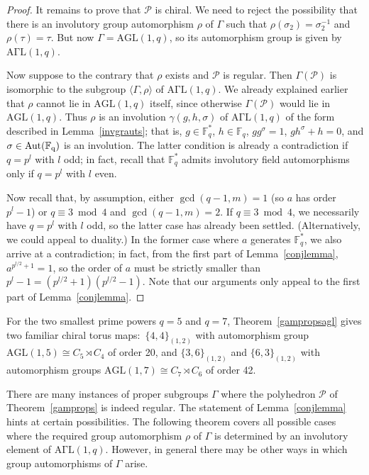 \documentclass[12pt]{article}
\theoremstyle{definition}\newtheorem{definition}{Definition}[section]
\begin{document}
\begin{proof}
It remains to prove that $\mathcal{P}$ is chiral. We need to reject the possibility that there is an involutory group automorphism $\rho$ of $\Gamma$ such that $\rho(\sigma_2)=\sigma_2^{-1}$ and $\rho(\tau)=\tau$. 
But now $\Gamma=\mathrm{AGL}(1,q)$, so its automorphism group is given by $\mathrm{A\Gamma L}(1,q)$. 

Now suppose to the contrary that $\rho$ exists and $\mathcal{P}$ is regular. Then $\Gamma(\mathcal{P})$ is isomorphic to the subgroup $\langle\Gamma,\rho\rangle$ of $\mathrm{A\Gamma L}(1,q)$. We already explained earlier that $\rho$ cannot lie in $\mathrm{AGL}(1,q)$ itself, since otherwise $\Gamma(\mathcal{P})$ would lie in $\mathrm{AGL}(1,q)$. Thus $\rho$ is an involution $\gamma(g,h,\sigma)$ of $\mathrm{A\Gamma L}(1,q)$ of the form described in Lemma~\ref{invgrauts}; that is, $g\in\mathbb{F}_q^*$, $h\in\mathbb{F}_q$, $gg^{\sigma} = 1$,  $gh^\sigma +h=0$, and $\sigma\in\rm{Aut}(\mathbb{F}_q)$ is an involution. The latter condition is already a contradiction if $q=p^l$ with $l$ odd; in fact, recall that $\mathbb{F}_q^*$ admits involutory field automorphisms only if $q=p^l$ with $l$ even.

Now recall that, by assumption, either $\gcd(q-1,m)=1$ (so $a$ has order $p^{l}-1$) or $q\equiv 3\bmod 4$ and ${\gcd(q-1,m)=2}$. If $q\equiv 3\bmod 4$, we necessarily have $q=p^l$ with $l$ odd, so the latter case has already been settled. (Alternatively, we could appeal to duality.) In the former case where $a$ generates $\mathbb{F}_q^*$, we also arrive at a contradiction; in fact, from the first part of Lemma~\ref{conjlemma}, $a^{p^{l/2} +1}=1$, so the order of $a$ must be strictly smaller than $p^{l}-1=(p^{l/2}+1)(p^{l/2}-1)$. Note that our arguments only appeal to the first part of Lemma~\ref{conjlemma}.
\end{proof}
\medskip

For the two smallest prime powers $q=5$ and $q=7$, Theorem~\ref{gampropsagl} gives two familiar chiral torus maps:\ $\{4,4\}_{(1,2)}$ with automorphism group $\mathrm{AGL}(1,5)\cong C_5\rtimes C_4$ of order 20, and $\{3,6\}_{(1,2)}$ and $\{6,3\}_{(1,2)}$ with automorphism groups $\mathrm{AGL}(1,7)\cong C_7\rtimes C_6$ of order 42. 
\bigskip

There are many instances of proper subgroups $\Gamma$ where the polyhedron $\mathcal{P}$ of Theorem~\ref{gamprops} is indeed regular. The statement of Lemma~\ref{conjlemma} hints at certain possibilities. The following theorem covers all possible cases where the required group automorphism $\rho$ of $\Gamma$ is determined by an involutory element of $\mathrm{A\Gamma L}(1,q)$. However, in general there may be other ways in which group automorphisms of $\Gamma$ arise.
\end{document}
